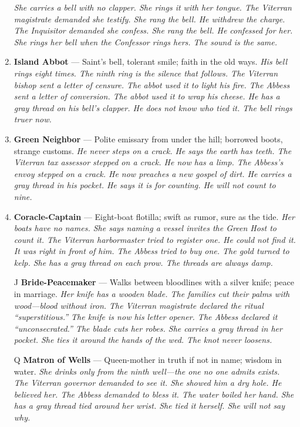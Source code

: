\begin{enumerate}
  \hfill \textit{She carries a bell with no clapper. She rings it with her tongue. The Viterran magistrate demanded she testify. She rang the bell. He withdrew the charge. The Inquisitor demanded she confess. She rang the bell. He confessed for her. She rings her bell when the Confessor rings hers. The sound is the same.}
\item \textbf{Island Abbot} --- Saint's bell, tolerant smile; faith in the old ways.
  \hfill \textit{His bell rings eight times. The ninth ring is the silence that follows. The Viterran bishop sent a letter of censure. The abbot used it to light his fire. The Abbess sent a letter of conversion. The abbot used it to wrap his cheese. He has a gray thread on his bell's clapper. He does not know who tied it. The bell rings truer now.}
\item \textbf{Green Neighbor} --- Polite emissary from under the hill; borrowed boots, strange customs.
  \hfill \textit{He never steps on a crack. He says the earth has teeth. The Viterran tax assessor stepped on a crack. He now has a limp. The Abbess's envoy stepped on a crack. He now preaches a new gospel of dirt. He carries a gray thread in his pocket. He says it is for counting. He will not count to nine.}
\item \textbf{Coracle-Captain} --- Eight-boat flotilla; swift as rumor, sure as the tide.
  \hfill \textit{Her boats have no names. She says naming a vessel invites the Green Host to count it. The Viterran harbormaster tried to register one. He could not find it. It was right in front of him. The Abbess tried to buy one. The gold turned to kelp. She has a gray thread on each prow. The threads are always damp.}
\item[J] \textbf{Bride-Peacemaker} --- Walks between bloodlines with a silver knife; peace in marriage.
  \hfill \textit{Her knife has a wooden blade. The families cut their palms with wood---blood without iron. The Viterran magistrate declared the ritual ``superstitious.'' The knife is now his letter opener. The Abbess declared it ``unconsecrated.'' The blade cuts her robes. She carries a gray thread in her pocket. She ties it around the hands of the wed. The knot never loosens.}
\item[Q] \textbf{Matron of Wells} --- Queen-mother in truth if not in name; wisdom in water.
  \hfill \textit{She drinks only from the ninth well---the one no one admits exists. The Viterran governor demanded to see it. She showed him a dry hole. He believed her. The Abbess demanded to bless it. The water boiled her hand. She has a gray thread tied around her wrist. She tied it herself. She will not say why.}

\end{enumerate}
